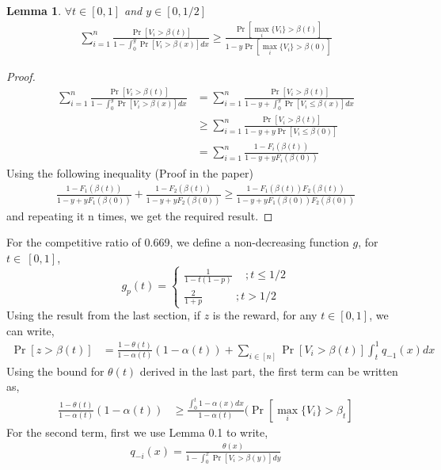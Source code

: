 \documentclass[10pt, letterpaper, twoside]{article}
\newtheorem{lemma}[theorem]{Lemma}
\begin{document}
	\begin{lemma}
		$\forall t \in [0,1]$ and $y \in [0,1/2]$
		\begin{align*}
		\sum_{i=1}^{n} \frac{\Pr[V_{i}>\beta(t)]}{1-\int_{0}^{y} \Pr[V_{i}>\beta(x)] dx} \geq \frac{\Pr[\max_{i} \{V_{i}\} > \beta(t)]}{1-y\Pr[\max_{i} \{V_{i}\} > \beta(0)]}
		\end{align*}
	\end{lemma}
	\begin{proof}
		\begin{align*}
		\sum_{i=1}^{n} \frac{\Pr[V_{i}>\beta(t)]}{1-\int_{0}^{y} \Pr[V_{i}>\beta(x)] dx} &= \sum_{i=1}^{n} \frac{\Pr[V_{i}>\beta(t)]}{1-y+\int_{0}^{y} \Pr[V_{i}\leq\beta(x)] dx}\\
		&\geq \sum_{i=1}^{n} \frac{\Pr[V_{i}>\beta(t)]}{1-y+y\Pr[V_{i}\leq\beta(0)]}\\
		&=\sum_{i=1}^{n} \frac{1-F_{i}(\beta(t))}{1-y+yF_{i}(\beta(0))}
		\end{align*}
		Using the following inequality	 (Proof in the paper)
		\begin{align*} 
		\frac{1-F_{1}(\beta(t))}{1-y+yF_{1}(\beta(0))} + \frac{1-F_{2}(\beta(t))}{1-y+yF_{2}(\beta(0))} \geq \frac{1-F_{1}(\beta(t))F_{2}(\beta(t))}{1-y+yF_{1}(\beta(0))F_{2}(\beta(0))} 
		\end{align*}  
		and repeating it n times, we get the required result.
	\end{proof}
	For the competitive ratio of 0.669, we define a non-decreasing function $g$, for $t \in\ [0,1]$,
	$$g_{p}(t) = \begin{cases}
	\frac{1}{1-t(1-p)}  \quad \,; t \leq 1/2 \\
	\frac{2}{1+p} \quad \quad \quad; t > 1/2
	\end{cases}
	$$
	Using the result from the last section, if $z$ is the reward, for any $t \in [0,1]$, we can write,\\
	\begin{align*}
	\Pr[z > \beta(t)] &= \frac{1-\theta(t)}{1-\alpha(t)} (1-\alpha(t)) + \sum_{i \in [n]} \Pr[V_{i} > \beta(t)] \int_{t}^{1} q_{-1}(x) dx
	\end{align*}
	Using the bound for $\theta(t)$ derived in the last part, the first term can be written as,
	\begin{align*}
	\frac{1-\theta(t)}{1-\alpha(t)} (1-\alpha(t)) &\geq \frac{\int_{0}^{t} 1 - \alpha(x) dx}{1-\alpha(t)} (\Pr[\max_{i} \{V_{i}\} > \beta_{t}]
	\end{align*}
	For the second term, first we use Lemma 0.1 to write,
	\begin{align*}
	q_{-i}(x) = \frac{\theta(x)}{1-\int_{0}^{x} \Pr[V_{i} > \beta(y)]  dy}
	\end{align*}
\end{document}
